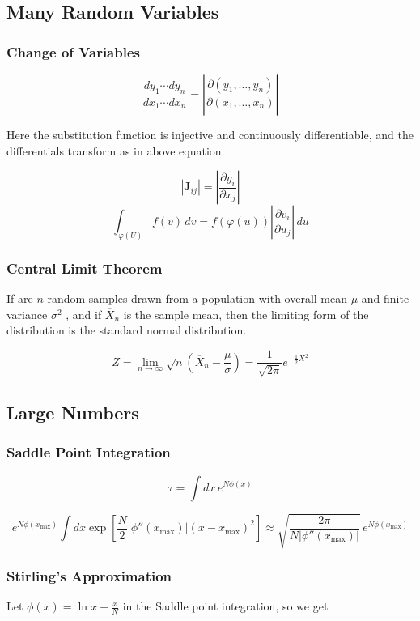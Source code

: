 \documentclass{article}
\begin{document}
\subsection{Many Random Variables}
\subsubsection{Change of Variables}

$$\frac{dy_1 \cdots dy_n}{dx_1 \cdots dx_n} = \left| \frac{\partial (y_1, \ldots, y_n)}{\partial (x_1, \ldots, x_n)} \right|$$

Here the substitution function is injective and continuously differentiable, and the differentials transform as in above equation.

$$|\mathbf{J}_{ij}| = \left| \frac{\partial y_i}{\partial x_j} \right|
$$
$$\int_{\varphi(U)} f(v) \,dv = f(\varphi(u)) \left| \frac{\partial v_i}{\partial u_j} \right| \, du $$




\subsubsection{Central Limit Theorem}

If are $n$ random samples drawn from a population with overall mean $\mu $ and finite variance $\sigma^2$ , and if $\overline{X}_n
$
is the sample mean, then the limiting form of the distribution is the  standard normal distribution.

$$Z = \lim_{n \to \infty} \sqrt{n} \left( \overline{X}_n - \frac{\mu}{\sigma} \right) = \frac{1}{\sqrt{2\pi}} e^{-\frac{1}{2}X^2}
$$

\subsection{Large Numbers}

\subsubsection{Saddle Point Integration}
$$\tau = \int dx \, e^{N\phi(x)} 
 $$

 $$e^{N\phi(x_{\text{max}})} \int dx \exp\left[\frac{N}{2}|\phi''(x_{\text{max}})|(x-x_{\text{max}})^2\right] \approx \sqrt{\frac{2\pi}{N|\phi''(x_{\text{max}})|}} \, e^{N\phi(x_{\text{max}})}
$$


\subsubsection{Stirling's Approximation}
Let $\phi(x) = \ln x - \frac{x}{N}
$ in the Saddle point integration, so we get
\end{document}
